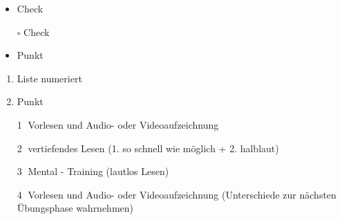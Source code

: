 \begin{itemize}[label=\checkmark] %
	\item Check
\end{itemize}

\begin{itemize} 
	\item [$\square$] Check
\end{itemize}

\begin{itemize} 
	\item Punkt
\end{itemize}

\begin{enumerate} 
	\item Liste numeriert
	\item Punkt
\end{enumerate}

\begin{itemize} 
	\item [\textcircled{1}] Vorlesen und Audio- oder Videoaufzeichnung
	\item [\textcircled{2}] vertiefendes Lesen (1. so schnell wie möglich + 2. halblaut)
	\item [\textcircled{3}] Mental - Training (lautlos Lesen)
	\item [\textcircled{4}] Vorlesen und Audio- oder Videoaufzeichnung (Unterschiede zur nächsten Übungsphase wahrnehmen)
\end{itemize}